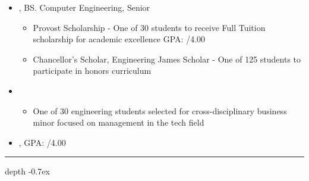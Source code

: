 \documentclass[11pt,letterpaper]{article}
\def\Vhrulefill{\leavevmode\leaders\hrule height 0.7ex depth \dimexpr0.4pt-0.7ex\hfill\kern0pt}
\begin{document}
\begin{itemize}[label={}]
 \item \small{, BS. Computer Engineering, Senior \hfill {}}
 \vspace{-1.58mm}
 \begin{itemize}[label={}]
    \item \small{Provost Scholarship - One of 30 students to receive Full Tuition scholarship for academic excellence \hfill GPA: /4.00}
 	\item \small{Chancellor's Scholar, Engineering James Scholar - One of 125 students to participate in honors curriculum}
 \end{itemize}
 
 \item \small{}
 \vspace{-1.58mm}
 \begin{itemize}[label={}]
    \item \small{One of 30 engineering students selected for cross-disciplinary business minor focused on management in the tech field}
 \end{itemize}

 \item \small{, GPA: /4.00 \hfill {}}

\end{itemize}



%
%


\noindent \large{}  \Vhrulefill
\vspace{-.35mm}
\end{document}
